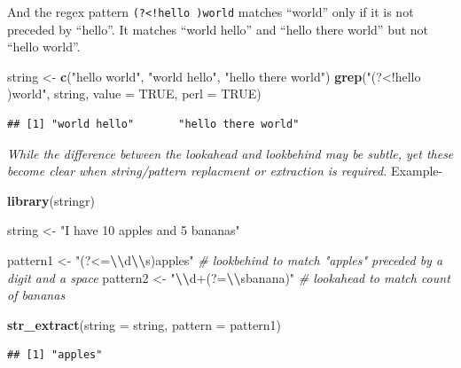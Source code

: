 \documentclass[
]{book}
\newenvironment{Shaded}{\begin{snugshade}}{\end{snugshade}}
\newcommand{\AttributeTok}[1]{\textcolor[rgb]{0.13,0.29,0.53}{#1}}
\newcommand{\CommentTok}[1]{\textcolor[rgb]{0.56,0.35,0.01}{\textit{#1}}}
\newcommand{\ConstantTok}[1]{\textcolor[rgb]{0.56,0.35,0.01}{#1}}
\newcommand{\FunctionTok}[1]{\textcolor[rgb]{0.13,0.29,0.53}{\textbf{#1}}}
\newcommand{\NormalTok}[1]{#1}
\newcommand{\OtherTok}[1]{\textcolor[rgb]{0.56,0.35,0.01}{#1}}
\newcommand{\SpecialCharTok}[1]{\textcolor[rgb]{0.81,0.36,0.00}{\textbf{#1}}}
\newcommand{\StringTok}[1]{\textcolor[rgb]{0.31,0.60,0.02}{#1}}
\begin{document}
And the regex pattern \texttt{(?\textless{}!hello\ )world} matches ``world'' only if it is not preceded by ``hello''. It matches ``world hello'' and ``hello there world'' but not ``hello world''.

\begin{Shaded}
\begin{Highlighting}[]
\NormalTok{string }\OtherTok{\textless{}{-}} \FunctionTok{c}\NormalTok{(}\StringTok{"hello world"}\NormalTok{, }\StringTok{"world hello"}\NormalTok{, }\StringTok{"hello there world"}\NormalTok{)}
\FunctionTok{grep}\NormalTok{(}\StringTok{"(?\textless{}!hello )world"}\NormalTok{, string, }\AttributeTok{value =} \ConstantTok{TRUE}\NormalTok{, }\AttributeTok{perl =} \ConstantTok{TRUE}\NormalTok{)}
\end{Highlighting}
\end{Shaded}

\begin{verbatim}
## [1] "world hello"       "hello there world"
\end{verbatim}

\emph{While the difference between the lookahead and lookbehind may be subtle, yet these become clear when string/pattern replacment or extraction is required.} Example-

\begin{Shaded}
\begin{Highlighting}[]
\FunctionTok{library}\NormalTok{(stringr)}

\NormalTok{string }\OtherTok{\textless{}{-}} \StringTok{"I have 10 apples and 5 bananas"}

\NormalTok{pattern1 }\OtherTok{\textless{}{-}} \StringTok{"(?\textless{}=}\SpecialCharTok{\textbackslash{}\textbackslash{}}\StringTok{d}\SpecialCharTok{\textbackslash{}\textbackslash{}}\StringTok{s)apples"}  \CommentTok{\# lookbehind to match "apples" preceded by a digit and a space}
\NormalTok{pattern2 }\OtherTok{\textless{}{-}} \StringTok{"}\SpecialCharTok{\textbackslash{}\textbackslash{}}\StringTok{d+(?=}\SpecialCharTok{\textbackslash{}\textbackslash{}}\StringTok{sbanana)"}  \CommentTok{\# lookahead to match count of bananas}

\FunctionTok{str\_extract}\NormalTok{(}\AttributeTok{string =}\NormalTok{ string, }\AttributeTok{pattern =}\NormalTok{ pattern1)}
\end{Highlighting}
\end{Shaded}

\begin{verbatim}
## [1] "apples"
\end{verbatim}
\end{document}
